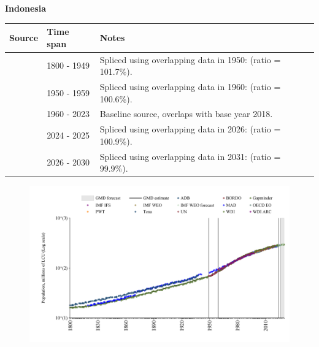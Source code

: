 \documentclass[12pt,a4paper,landscape]{article}
\begin{document}
\begin{adjustbox}{max totalsize={\paperwidth}{\paperheight},center}
\begin{minipage}[t][\textheight][t]{\textwidth}
\vspace*{0.5cm}
{}
\begin{center}
{\Large\bfseries Indonesia}
\end{center}
\vspace{0.5cm}
\begin{table}[H]
\centering
\small
\begin{tabular}{|l|l|l|}
\hline
\textbf{Source} & \textbf{Time span} & \textbf{Notes} \\
\hline
\rowcolor{white}\cite{Gapminder}& 1800 - 1949 &Spliced using overlapping data in 1950: (ratio = 101.7\%).\\
\rowcolor{lightgray}\cite{IMF_IFS}& 1950 - 1959 &Spliced using overlapping data in 1960: (ratio = 100.6\%).\\
\rowcolor{white}\cite{WDI}& 1960 - 2023 &Baseline source, overlaps with base year 2018.\\
\rowcolor{lightgray}\cite{OECD_EO}& 2024 - 2025 &Spliced using overlapping data in 2026: (ratio = 100.9\%).\\
\rowcolor{white}\cite{Gapminder}& 2026 - 2030 &Spliced using overlapping data in 2031: (ratio = 99.9\%).\\
\hline
\end{tabular}
\end{table}
\begin{figure}[H]
\centering
\includegraphics[width=\textwidth,height=0.6\textheight,keepaspectratio]{graphs/IDN_pop.pdf}
\end{figure}
\end{minipage}
\end{adjustbox}
\end{document}
